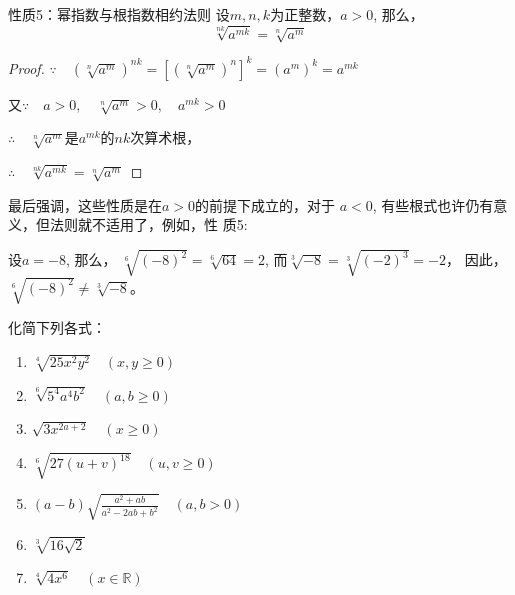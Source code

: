 \begin{blk}{性质5：幂指数与根指数相约法则}
设$m,n,k$为正整数，$a>0$, 那么，
\[\sqrt[nk]{a^{mk}}=\sqrt[n]{a^m} \]  
\end{blk}

\begin{proof}
$\because\quad \left(\sqrt[n]{a^m}\right)^{nk}=\left[\left(\sqrt[n]{a^m}\right)^n\right]^k=\left(a^m\right)^k=a^{mk}$

又$\because\quad a>0,\quad \sqrt[n]{a^m}>0,\quad a^{mk}>0 $
    
$\therefore\quad \sqrt[n]{a^m}$是$a^{mk}$的$nk$次算术根，

$\therefore\quad \sqrt[nk]{a^{mk}}=\sqrt[n]{a^m} $
\end{proof}

最后强调，这些性质是在$a>0$的前提下成立的，对于
$a<0$, 有些根式也许仍有意义，但法则就不适用了，例如，性
质5:

设$a=-8$, 那么，
$\sqrt[6]{(-8)^2}=\sqrt[6]{64}=2$, 而$\sqrt[3]{-8}=\sqrt[3]{(-2)^3}=-2$，
因此，$\sqrt[6]{(-8)^2}\ne \sqrt[3]{-8}$。



\begin{example}
    化简下列各式：
\begin{enumerate}
\item $\sqrt[4]{25 x^{2} y^{2}} \quad(x, y \ge 0)$
\item  $\sqrt[6]{5^{4} a^{4} b^{2}}\quad (a, b \ge 0)$
\item $\sqrt{3 x^{2 a+2}}\quad (x \ge 0)$
\item $\sqrt[6]{27(u+v)^{18}}\quad (u,v\ge 0)$
\item $(a-b) \sqrt{\frac{a^{2}+a b}{a^{2}-2 a b+b^{2}}}\quad (a, b>0)$
\item $\sqrt[3]{16 \sqrt{2}}$
\item $\sqrt[4]{4 x^{6}}\quad (x \in \mathbb{R})$
\end{enumerate}
\end{example}

